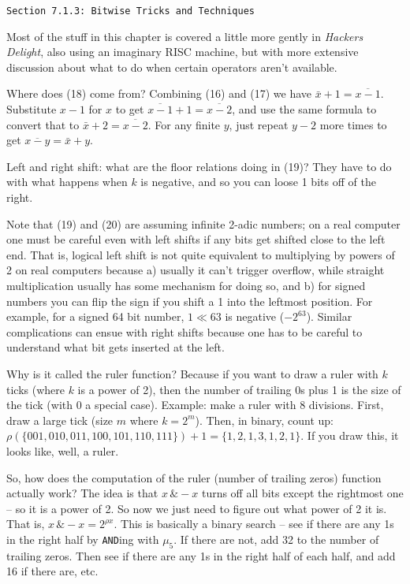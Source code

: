 \vfil\break

\vskip 0.3in
\centerline{\tt Section 7.1.3: Bitwise Tricks and Techniques}
\vskip0.2in

Most of the stuff in this chapter is covered a little more gently
in {\it Hackers Delight}, also using an imaginary RISC machine,
but with more extensive discussion about what to do when certain
operators aren't available.

\vskip 0.1in 

\noindent [p 135] Where does (18) come from?  Combining (16) and
(17) we have $\bar x + 1 = \overline{x - 1}$.  Substitute $x-1$ for $x$
to get $\overline{x - 1} + 1 = \overline{x - 2}$, and use the same
formula to convert that to $\bar x + 2 = \overline{x - 2}$.  For any
finite $y$, just repeat $y-2$ more times to get $\overline{x - y} = \bar x + y$.

\vskip 0.08in \noindent [p 135] Left and right shift: what are the floor
relations doing in (19)?  They have to do with what happens when $k$
is negative, and so you can loose 1 bits off of the right.

Note that (19) and (20) are assuming infinite 2-adic numbers; on a real
computer one must be careful even with left shifts if any bits get shifted
close to the left end.  That is, logical left shift is not quite equivalent
to multiplying by powers of 2 on real computers because a) usually
it can't trigger overflow, while straight multiplication usually has
some mechanism for doing so, and b) for signed numbers you can
flip the sign if you shift a 1 into the leftmost position.  For example,
for a signed 64 bit number, $1 \ll 63$ is negative ($-2^{63}$).
Similar complications can ensue with right shifts because one has to
be careful to understand what bit gets inserted at the left.

\vskip 0.08in \noindent [p 140] Why is it called the ruler function?
Because if you want to draw a ruler with $k$ ticks (where $k$ is
a power of 2), then the number of trailing 0s plus 1 is the size of the
tick (with 0 a special case).  Example: make a ruler with 8
divisions. First, draw a large tick (size $m$ where $k = 2^m$).  
Then, in binary, count up:
$\rho\left(\{001, 010, 011, 100, 101, 110, 111\}\right) + 1 = 
\{1, 2, 1, 3, 1, 2, 1\}$.  If you draw this, it looks like, well,
a ruler. 

\vskip 0.08in \noindent [p 141] So, how does the computation
of the ruler (number of trailing zeros) function actually work?  The idea
is that $x\, \& -x$ turns off all bits except the rightmost one --
so it is a power of 2.  So now we just need to figure
out what power of 2 it is.  That is, $x\, \& -x = 2^{\rho x}$.
This is basically a binary search -- see if there are any 1s
in the right half by {\tt AND}ing with $\mu_5$.  If there are not,
add 32 to the number of trailing zeros.  Then see if there are any
1s in the right half of each half, and add 16 if there are, etc.

